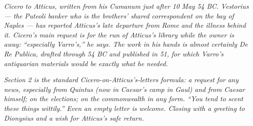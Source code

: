 
\textit{Cicero to Atticus, written from his Cumanum just after 10
May 54 BC. Vestorius --- the Puteoli banker who is the brothers'
shared correspondent on the bay of Naples --- has reported
Atticus's late departure from Rome and the illness behind it.
Cicero's main request is for the run of Atticus's library while
the owner is away: ``especially Varro's,'' he says. The work
in his hands is almost certainly \textit{De Re Publica}, drafted
through 54 BC and published in 51, for which Varro's antiquarian
materials would be exactly what he needed.}

\textit{Section 2 is the standard Cicero-on-Atticus's-letters
formula: a request for any news, especially from Quintus (now in
Caesar's camp in Gaul) and from Caesar himself; on the elections;
on the commonwealth in any form. ``You tend to scent these things
wittily.'' Even an empty letter is welcome. Closing with a greeting
to Dionysius and a wish for Atticus's safe return.}

